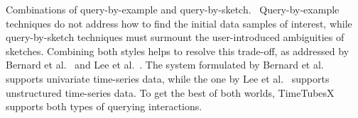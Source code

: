 \textsf{Combinations of query-by-example and query-by-sketch.\ }
Query-by-example techniques do not address how to find the initial data samples of interest, 
while query-by-sketch techniques must surmount the user-introduced ambiguities of sketches.
Combining both styles helps to resolve this trade-off, as addressed by 
Bernard et al.~\cite{Bernard2010} and Lee et al.~\cite{Lee2019}. 
The system formulated by Bernard et al.~\cite{Bernard2010} supports univariate time-series data, while the one by Lee et al.~\cite{Lee2019} supports unstructured time-series data.
To get the best of both worlds, TimeTubesX supports both types of querying interactions.
%




